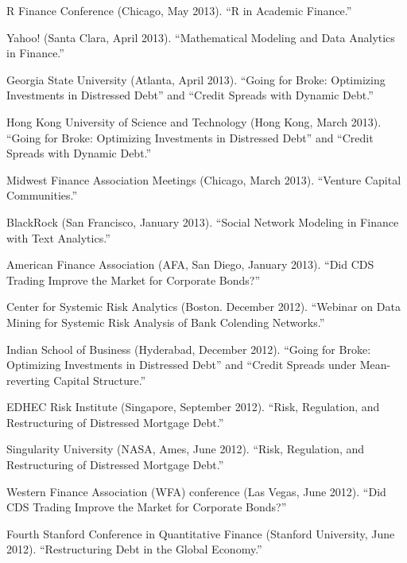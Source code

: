 \documentclass{article}
\begin{document}
\begin{etaremune}
{\item R Finance Conference (Chicago, May 2013). ``R in Academic Finance.''

\item Yahoo! (Santa Clara, April 2013). ``Mathematical Modeling and Data Analytics in Finance.''

\item Georgia State University (Atlanta, April 2013). ``Going for Broke: Optimizing Investments in Distressed Debt'' and ``Credit Spreads with Dynamic Debt.''

\item Hong Kong University of Science and Technology (Hong Kong, March 2013). ``Going for Broke: Optimizing Investments in Distressed Debt'' and ``Credit Spreads with Dynamic Debt.''


\item Midwest Finance Association Meetings (Chicago, March 2013). ``Venture Capital Communities.''

\item BlackRock (San Francisco, January 2013). ``Social Network Modeling in Finance with Text Analytics.''

\item American Finance Association (AFA, San Diego, January 2013). ``Did CDS Trading Improve the Market for Corporate Bonds?''

\item Center for Systemic Risk Analytics (Boston. December 2012). ``Webinar on Data Mining for Systemic Risk Analysis of Bank Colending Networks.''

\item Indian School of Business (Hyderabad, December 2012). 
``Going for Broke: Optimizing Investments in Distressed Debt'' and ``Credit Spreads under Mean-reverting Capital Structure.''

\item EDHEC Risk Institute (Singapore, September 2012). ``Risk, Regulation, and Restructuring of Distressed Mortgage Debt.'' 

\item Singularity University (NASA, Ames, June 2012). ``Risk, Regulation, and Restructuring of Distressed Mortgage Debt.'' 

\item Western Finance Association (WFA) conference (Las Vegas, June 2012). ``Did CDS Trading Improve the Market for Corporate Bonds?''

\item Fourth Stanford Conference in Quantitative Finance (Stanford University, June 2012). ``Restructuring Debt in the Global Economy.''


}
\end{etaremune}
\end{document}
